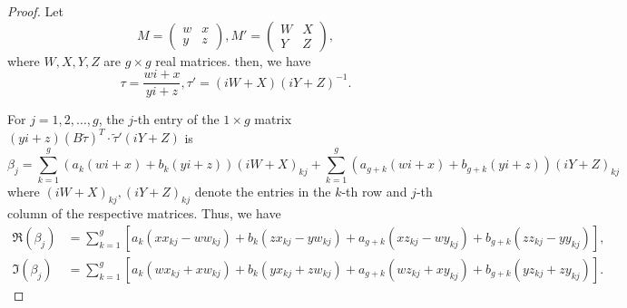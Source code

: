 \documentclass[12pt]{amsart}
\def\wt{\widetilde}
\theoremstyle{definition}
\begin{document}
\begin{proof}
Let
\begin{equation*}
    M=\begin{pmatrix}w & x\\ y & z\end{pmatrix},
    M'=\begin{pmatrix}W & X\\ Y& Z\end{pmatrix},
\end{equation*}
 where $W,X,Y,Z$ are $g\times g$ real matrices. then, we have
 \begin{equation*}
     \tau=\frac{wi+x}{yi+z},\tau'=(iW+X)(iY+Z)^{-1}.
 \end{equation*}


For $j=1,2,\ldots,g$, the $j$-th entry of the $1\times g$ matrix $(yi+z)(B\tilde{\tau})^T \cdot \tilde{\tau}'(iY+Z)$
is
\begin{equation*}
    \beta_j=\sum_{k=1}^{g}(a_k(wi+x)+b_k(yi+z))(iW+X)_{kj}+\sum_{k=1}^{g}(a_{g+k}(wi+x)+b_{g+k}(yi+z))(iY+Z)_{kj}
\end{equation*}
where $(iW+X)_{kj},(iY+Z)_{kj}$ denote the entries in the $k$-th row and $j$-th column of the respective matrices. Thus, we have
\begin{align*}
    \Re(\beta_j)&=\sum_{k=1}^g [a_k(xx_{kj}-ww_{kj})+b_k(zx_{kj}-yw_{kj})+a_{g+k}(xz_{kj}-wy_{kj})+b_{g+k}(zz_{kj}-yy_{kj})],\\
    \Im(\beta_j)&=\sum_{k=1}^g [a_k(wx_{kj}+xw_{kj})+b_k(yx_{kj}+zw_{kj})+a_{g+k}(wz_{kj}+xy_{kj})+b_{g+k}(yz_{kj}+zy_{kj})].
\end{align*}


\end{proof}
\end{document}
